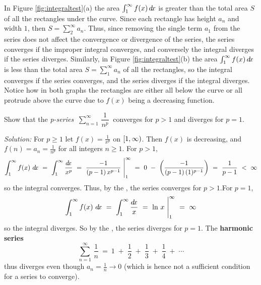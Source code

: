 In Figure \ref{fig:integraltest}(a) the area $\int_1^{\infty} f(x)\,d\!x$ is
greater than the total area $S$ of all the rectangles under the curve. Since
each rectangle has height $a_n$ and width $1$, then $S=\sum_2^{\infty} a_n$.
Thus, since removing the single term $a_1$ from the series does not affect the
convergence or divergence of the series, the series converges if the improper
integral converges, and conversely the integral diverges if the series diverges.
Similarly, in Figure \ref{fig:integraltest}(b) the area
$\int_1^{\infty} f(x)\,d\!x$ is less than the total area $S=\sum_1^{\infty} a_n$
of all the rectangles, so the integral converges if the series converges, and
the series diverges if the integral diverges. Notice how in both graphs the
rectangles are either all below the curve or all protrude above the curve due to
$f(x)$ being a decreasing function.

\newpage
\begin{exmp}\label{exmp:pseries}
\noindent Show that the \emph{p-series}
$~\displaystyle\sum_{n=1}^{\infty} \,\dfrac{1}{n^p}~$
converges for $p>1$ and diverges for $p=1$.\vspace{1mm}
\par\noindent\emph{Solution:} For $p \ge 1$ let $f(x) = \frac{1}{x^p}$ on
$\lbrack 1,\infty )$. Then $f(x)$ is decreasing, and $f(n) = a_n = \frac{1}{n^p}$
for all integers $n\ge 1$. For $p > 1$,
\[
\int_1^{\infty} f(x)~d\!x ~=~ \int_1^{\infty} \frac{d\!x}{x^p} ~=~
\frac{-1}{(p-1)\,x^{p-1}}~\Biggr|_1^{\infty} ~=~ 0 ~-~
\left(\frac{-1}{(p-1)\,(1)^{p-1}}\right) ~=~ \frac{1}{p-1} ~<~ \infty
\]
so the integral converges. Thus, by the , the series converges for
$p>1$.\newline\noindent For $p=1$,
\[
\int_1^{\infty} f(x)~d\!x ~=~ \int_1^{\infty} \frac{d\!x}{x} ~=~
\ln\,x~\Biggr|_1^{\infty} ~=~ \infty
\]
so the integral diverges. So by the , the series diverges for
$p=1$. The \textbf{harmonic series}
\[
\sum_{n=1}^{\infty} \,\frac{1}{n} ~=~ 1 \;+\; \frac{1}{2} \;+\; \frac{1}{3}
\;+\; \frac{1}{4} \;+\; \cdots
\]
thus diverges even though $a_n = \frac{1}{n} \rightarrow 0$ (which is hence not
a sufficient condition for a series to converge).\vspace{1mm}
\end{exmp}
\divider


